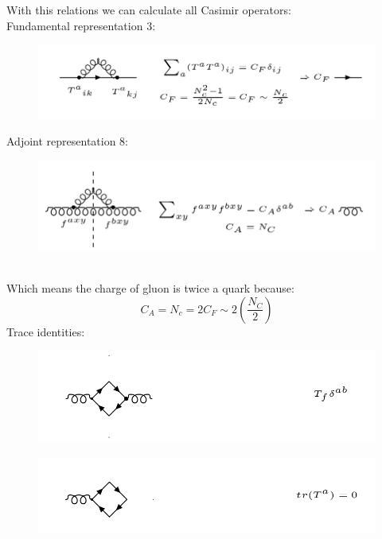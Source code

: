 With this relations we can calculate all Casimir operators:\\
Fundamental representation 3:\\
\begin{figure}[h!]
\centering
\includegraphics[scale=0.6]{images/Intro/Casimir1.png}
\end{figure}
Adjoint representation 8:\\
\begin{figure}[h!]
\centering
\includegraphics[scale=0.6]{images/Intro/Casimir2.png}
\end{figure}
\pagebreak
\\
Which means the charge of gluon is twice a quark because:
\begin{equation}
 C_A = N_c =2C_F \sim 2(\frac{N_C}{2}) 
\end{equation}
Trace identities:\\
\begin{figure}[h!]
\centering
\includegraphics[scale=0.6]{images/Intro/Casimir3.png}
\end{figure}
\begin{figure}[h!]
\centering
\includegraphics[scale=0.6]{images/Intro/Casimir4.png}
\end{figure}


